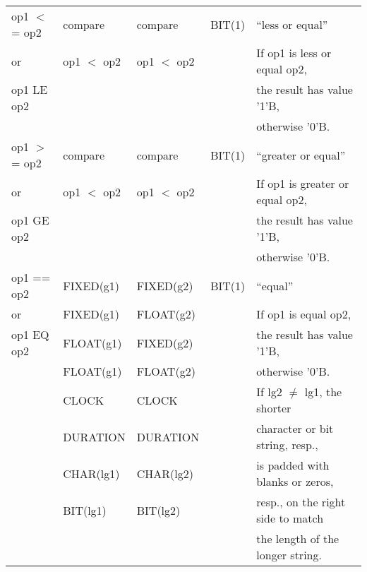 \begin{table}
\begin{center}
\begin{tabular}{|l|l|l|l|l|}
op1 $<$= op2     & compare         & compare         & BIT(1)               & ``less or equal''\\
or               & op1 $<$ op2     & op1 $<$ op2     &                      & If op1 is less or equal op2,\\
op1 LE op2       &                 &                 &                      & the result has value '1'B,\\
                 &                 &                 &                      & otherwise '0'B.\\ \hline

op1 $>$= op2     & compare         & compare         & BIT(1)               & ``greater or equal''\\
or               & op1 $<$ op2     & op1 $<$ op2     &                      & If op1 is greater or equal op2,\\
op1 GE op2       &                 &                 &                      & the result has value '1'B,\\
                 &                 &                 &                      & otherwise '0'B.\\ \hline

op1 == op2       & FIXED(g1)       & FIXED(g2)       & BIT(1)               & ``equal''\\
or               & FIXED(g1)       & FLOAT(g2)       &                      & If op1 is equal op2,\\
op1 EQ op2       & FLOAT(g1)       & FIXED(g2)       &                      & the result has value '1'B,\\
                 & FLOAT(g1)       & FLOAT(g2)       &                      & otherwise '0'B.\\
                 & CLOCK           & CLOCK           &                      & If lg2 $\neq$ lg1, the shorter\\
                 & DURATION        & DURATION        &                      & character or bit string, resp.,\\
                 & CHAR(lg1)       & CHAR(lg2)       &                      & is padded with blanks or zeros,\\
                 & BIT(lg1)        & BIT(lg2)        &                      & resp., on the right side to match\\
                 &                 &                 &                      & the length of the longer string.\\ \hline


\end{tabular}
\end{center}
\end{table}
